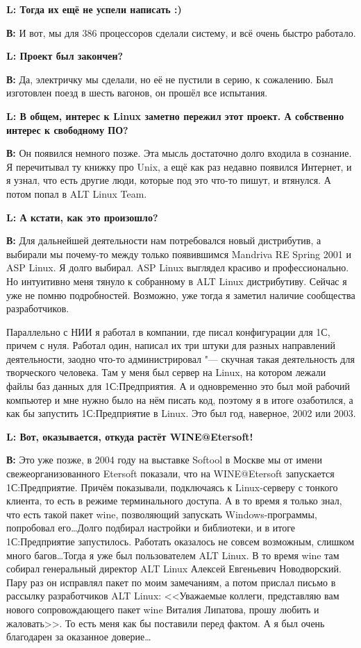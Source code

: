 \documentclass[10pt, a5paper]{article}
\begin{document}
{\noindent \bf L: Тогда их ещё не успели написать :)}

{\noindent \bf В:} И вот, мы для 386 процессоров сделали систему, и всё очень быстро работало.

{\noindent \bf L: Проект был закончен?}

{\noindent \bf В:} Да, электричку мы сделали, но её не пустили в серию, к сожалению. Был изготовлен поезд в шесть вагонов, он прошёл все испытания.

{\noindent \bf L: В общем, интерес к Linux заметно пережил этот проект. А собственно интерес к свободному ПО?}

{\noindent \bf В:} Он появился немного позже. Эта мысль достаточно долго входила в сознание. Я перечитывал ту книжку про Unix, а ещё как раз недавно появился Интернет, и я узнал, что есть другие люди, которые под это что-то пишут, и втянулся. А потом попал в ALT Linux Team.

{\noindent \bf L: А кстати, как это произошло?}

{\noindent \bf В:} Для дальнейшей деятельности нам потребовался новый дистрибутив, а выбирали мы почему-то между только появившимся Mandriva RE Spring 2001 и ASP Linux. Я долго выбирал. ASP Linux выглядел красиво и профессионально. Но интуитивно меня тянуло к собранному в ALT Linux дистрибутиву. Сейчас я уже не помню подробностей. Возможно, уже тогда я заметил наличие сообщества разработчиков.

Параллельно с НИИ я работал в компании, где  писал конфигурации для 1С, причем с нуля. Работал один, написал их три штуки для разных направлений деятельности, заодно что-то администрировал "--- скучная такая деятельность для творческого человека. Там у меня был сервер на Linux, на котором лежали файлы баз данных для 1С:Предприятия. А и одновременно это был мой рабочий компьютер и мне нужно было на нём писать код, поэтому я в итоге озаботился, а как бы запустить 1С:Предприятие в Linux. Это был год, наверное, 2002 или 2003.  

{\noindent \bf L: Вот, оказывается, откуда растёт WINE@Etersoft!}

{\noindent \bf В:} Это уже позже, в 2004 году на выставке Softool в Москве мы от имени свежеорганизованного Etersoft показали, что на  WINE@Etersoft запускается 1С:Предприятие. Причём показывали, подключаясь к Linux-серверу с тонкого клиента, то есть в режиме терминального доступа. А в то время я только знал, что есть такой пакет wine, позволяющий запускать Windows-программы, попробовал его\ldots Долго подбирал настройки и библиотеки, и в итоге 1С:Предприятие запустилось. Работать оказалось не совсем возможным, слишком много багов\ldots Тогда я уже был пользователем ALT Linux. В то время wine там собирал генеральный директор ALT Linux Алексей Евгеньевич Новодворский. Пару раз он исправлял пакет по моим замечаниям, а потом прислал письмо в рассылку разработчиков ALT Linux: <<Уважаемые коллеги, представляю вам нового сопровождающего пакет wine Виталия Липатова, прошу любить и жаловать>>. То есть меня как бы поставили перед фактом. А я был очень благодарен за оказанное доверие\ldots 
\end{document}
